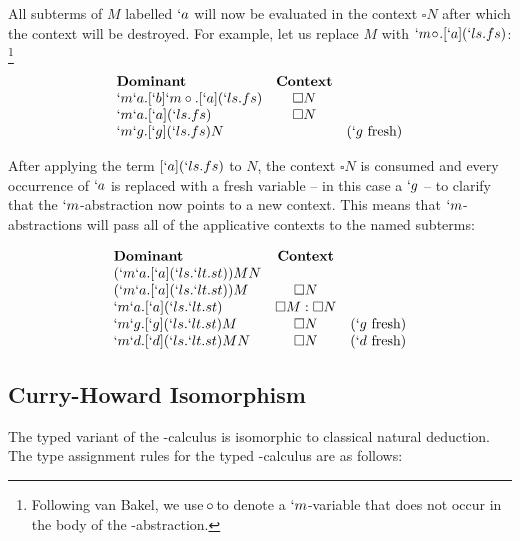   All subterms of $M$ labelled $`a$ will now be evaluated in the context $\square N$ after which the context will be destroyed. 
  For example, let us replace $M$ with \mbox{$`m\!\circ\!.[`a](`ls.fs)$}:
  \footnote{Following van Bakel, we use $\!\circ\!$ to denote a $`m$-variable that does not occur in the body of the \lmu-abstraction.}
  
  \begin{example}
    \[
    \begin{array}{lcr}
    \textbf{Dominant} & \textbf{Context} \\
    `m`a.[`b]`m\circ.[`a](`ls.fs)    & \square N \\
    `m`a.[`a](`ls.fs)    & \square N \\
    `m`g.[`g](`ls.fs)N   & & (`g\ \text{fresh})  \\
    \end{array}
    \]
  \end{example}

  After applying the term $[`a](`ls.fs)$ to $N$, 
  the context $\square N$ is consumed and every occurrence of $`a$ is replaced with a fresh variable 
  -- in this case a $`g$ -- 
  to clarify that the $`m$-abstraction now points to a new context. 
  This means that $`m$-abstractions will pass all of the applicative contexts to the named subterms:
  
  \begin{example}
    \[
    \begin{array}{lcr}
    \textbf{Dominant} & \textbf{Context} \\
    (`m`a.[`a](`ls.`lt.st)) M N \\
    (`m`a.[`a](`ls.`lt.st))M & \square N \\
    `m`a.[`a](`ls.`lt.st) & \square M:\square N \\
    `m`g.[`g](`ls.`lt.st)M & \square N & (`g\ \text{fresh}) \\
    `m`d.[`d](`ls.`lt.st)MN & \square N & (`d\ \text{fresh}) \\
    \end{array}
    \]
  \end{example}
  
  \subsection{Curry-Howard Isomorphism}
  The typed variant of the \lmu-calculus is isomorphic to classical natural deduction.
  The type assignment rules for the typed \lmu-calculus are as follows:
  
